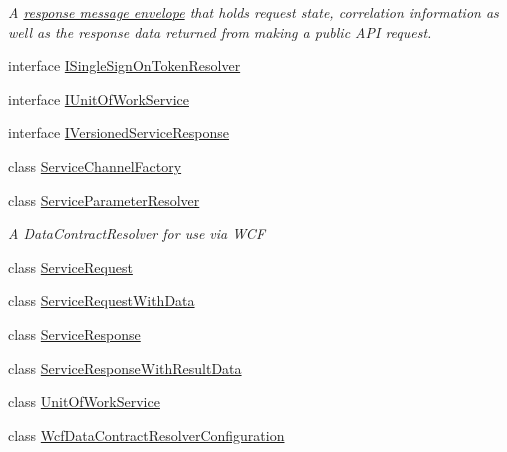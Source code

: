 \begin{DoxyCompactItemize}
\begin{DoxyCompactList}\small\item\em A \hyperlink{interfaceCqrs_1_1Services_1_1IServiceResponse}{response message envelope} that holds request state, correlation information as well as the response data returned from making a public A\+PI request. \end{DoxyCompactList}\item 
interface \hyperlink{interfaceCqrs_1_1Services_1_1ISingleSignOnTokenResolver}{I\+Single\+Sign\+On\+Token\+Resolver}
\item 
interface \hyperlink{interfaceCqrs_1_1Services_1_1IUnitOfWorkService}{I\+Unit\+Of\+Work\+Service}
\item 
interface \hyperlink{interfaceCqrs_1_1Services_1_1IVersionedServiceResponse}{I\+Versioned\+Service\+Response}
\item 
class \hyperlink{classCqrs_1_1Services_1_1ServiceChannelFactory}{Service\+Channel\+Factory}
\item 
class \hyperlink{classCqrs_1_1Services_1_1ServiceParameterResolver}{Service\+Parameter\+Resolver}
\begin{DoxyCompactList}\small\item\em A Data\+Contract\+Resolver for use via W\+CF \end{DoxyCompactList}\item 
class \hyperlink{classCqrs_1_1Services_1_1ServiceRequest}{Service\+Request}
\item 
class \hyperlink{classCqrs_1_1Services_1_1ServiceRequestWithData}{Service\+Request\+With\+Data}
\item 
class \hyperlink{classCqrs_1_1Services_1_1ServiceResponse}{Service\+Response}
\item 
class \hyperlink{classCqrs_1_1Services_1_1ServiceResponseWithResultData}{Service\+Response\+With\+Result\+Data}
\item 
class \hyperlink{classCqrs_1_1Services_1_1UnitOfWorkService}{Unit\+Of\+Work\+Service}
\item 
class \hyperlink{classCqrs_1_1Services_1_1WcfDataContractResolverConfiguration}{Wcf\+Data\+Contract\+Resolver\+Configuration}
\end{DoxyCompactItemize}
